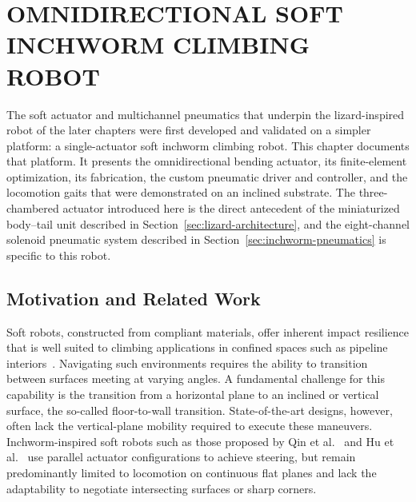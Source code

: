 

\section{OMNIDIRECTIONAL SOFT INCHWORM CLIMBING ROBOT}
\label{sec:inchworm-intro}

The soft actuator and multichannel pneumatics that underpin the
lizard-inspired robot of the later chapters were first developed and
validated on a simpler platform: a single-actuator soft inchworm climbing
robot. This chapter documents that platform. It presents the omnidirectional
bending actuator, its finite-element optimization, its fabrication, the
custom pneumatic driver and controller, and the locomotion gaits that were
demonstrated on an inclined substrate. The three-chambered actuator
introduced here is the direct antecedent of the miniaturized body--tail unit
described in Section~\ref{sec:lizard-architecture}, and the eight-channel
solenoid pneumatic system described in
Section~\ref{sec:inchworm-pneumatics} is specific to this robot.

\subsection{Motivation and Related Work}

Soft robots, constructed from compliant materials, offer inherent impact
resilience that is well suited to climbing applications in confined spaces
such as pipeline interiors~\cite{Gu2018SoftWallClimbing}. Navigating such environments
requires the ability to transition between surfaces meeting at varying
angles. A fundamental challenge for this capability is the transition from a
horizontal plane to an inclined or vertical surface, the so-called
floor-to-wall transition. State-of-the-art designs, however, often lack the
vertical-plane mobility required to execute these maneuvers. Inchworm-inspired
soft robots such as those proposed by Qin et al.~\cite{Qin2019Versatile} and
Hu et al.~\cite{Hu2023Inchworm} use parallel actuator configurations to
achieve steering, but remain predominantly limited to locomotion on
continuous flat planes and lack the adaptability to negotiate intersecting
surfaces or sharp corners.

